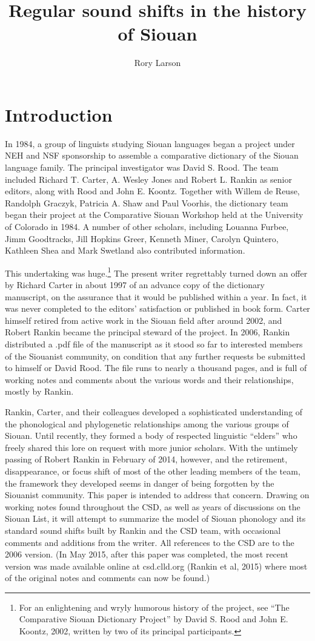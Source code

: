 \documentclass[output=paper]{LSP/langsci}
\author{Rory Larson}
\title{Regular sound shifts in the history of Siouan}
\begin{document}
\section{Introduction}  
In 1984, a group of linguists studying Siouan languages began a  project under NEH and NSF sponsorship to assemble a comparative dictionary of the Siouan language family.  The principal investigator was David S. Rood. The team included Richard T. Carter, A. Wesley Jones and Robert L. Rankin as senior editors, along with Rood and John E. Koontz.  Together with Willem de Reuse, Randolph Graczyk, Patricia A. Shaw and Paul Voorhis, the dictionary team began their project at the Comparative Siouan Workshop held at the University of Colorado in 1984.  A number of other scholars, including Louanna Furbee, Jimm Goodtracks, Jill Hopkins Greer, Kenneth Miner, Carolyn Quintero, Kathleen Shea and Mark Swetland also contributed information.

This undertaking was huge.\footnote{For an enlightening and wryly humorous history of the project, see ``The Comparative Siouan Dictionary Project'' by David S. Rood and John E. Koontz, 2002, written by two of its principal participants.} The present writer regrettably turned down an offer by Richard Carter in about 1997 of an advance copy of the dictionary manuscript, on the assurance that it would be published within a year.  In fact, it was never completed to the editors' satisfaction or published in book form. Carter himself retired from active work in the Siouan field after around 2002, and Robert Rankin became the principal steward of the project.  In 2006, Rankin distributed a .pdf file of the manuscript as it stood so far to interested members of the Siouanist community, on condition that any further requests be submitted to himself or David Rood.  The file runs to nearly a thousand pages, and is full of working notes and comments about the various words and their relationships, mostly by Rankin.

Rankin, Carter, and their colleagues developed a sophisticated understanding of the phonological and phylogenetic relationships among the various groups of Siouan.  Until recently, they formed a body of respected linguistic ``elders'' who freely shared this lore on request with more junior scholars.  With the untimely passing of Robert Rankin in February of 2014, however, and the retirement, disappearance, or focus shift of most of the other leading members of the team, the framework they developed seems in danger of being forgotten by the Siouanist community.  This paper is intended to address that concern.  Drawing on working notes found throughout the CSD, as well as years of discussions on the Siouan List, it will attempt to summarize the model of Siouan phonology and its standard sound shifts built by Rankin and the CSD team, with occasional comments and additions from the writer.  All references to the CSD are to the 2006 version. (In May 2015, after this paper was completed, the most recent version was made available online at csd.clld.org (Rankin et al, 2015) where most of the original notes and comments can now be found.)
\end{document}
